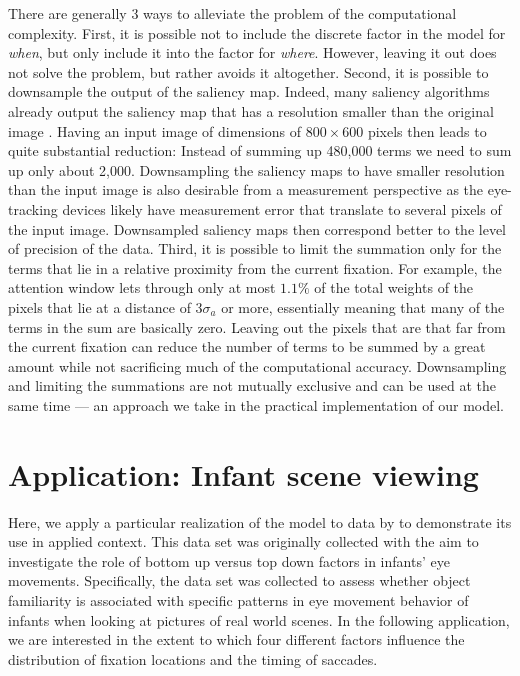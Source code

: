 \documentclass{article}
\begin{document}
There are generally 3 ways to alleviate the problem of the computational complexity. First, it is possible not to include the discrete factor in the model for \textit{when}, but only include it into the factor for \textit{where}. However, leaving it out does not solve the problem, but rather avoids it altogether. Second, it is possible to downsample the output of the saliency map. Indeed, many saliency algorithms already output the saliency map that has a resolution smaller than the original image \citep[e.g., by a factor of $16$ in each of the dimensions,][] {itti1998model}. Having an input image of dimensions of $800\times600$ pixels then leads to quite substantial reduction: Instead of summing up 480,000 terms we need to sum up only about 2,000. Downsampling the saliency maps to have smaller resolution than the input image is also desirable from a measurement perspective as the eye-tracking devices likely have measurement error that translate to several pixels of the input image.  Downsampled saliency maps then correspond better to the level of precision of the data. Third, it is possible to limit the summation only for the terms that lie in a relative proximity from the current fixation. For example, the attention window lets through only at most $1.1\%$ of the total weights of the pixels that lie at a distance of $3\sigma_a$ or more, essentially meaning that many of the terms in the sum are basically zero. Leaving out the pixels that are that far from the current fixation can reduce the number of terms to be summed by a great amount while not sacrificing much of the computational accuracy. Downsampling and limiting the summations are not mutually exclusive and can be used at the same time --- an approach we take in the practical implementation of our model.



\section{Application: Infant scene viewing}

Here, we apply a particular realization of the model to data by \citet{renswoude2019object_familiarity} to demonstrate its use in applied context. This data set was originally collected with the aim to investigate the role of bottom up versus top down factors in infants' eye movements. Specifically, the data set was collected to assess whether object familiarity is associated with specific patterns in eye movement behavior of infants when looking at pictures of real world scenes. In the following application, we are interested in the extent to which four different factors influence the distribution of fixation locations and the timing of saccades. 
\end{document}

